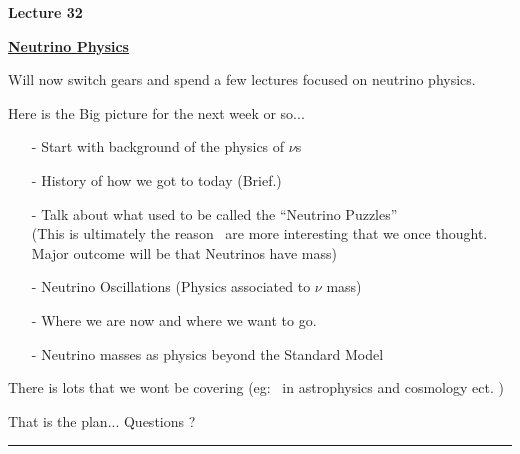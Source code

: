 
\usepackage{braket}
\usepackage{bbm}
\usepackage{relsize}
\usepackage{tcolorbox}




\usepackage{fancyhdr}

\fancyhf{}


\thispagestyle{fancy}

\begin{center}
{\huge \textbf{Lecture 32}}
\end{center}

{\fontsize{14}{16}\selectfont

\textbf{\underline{Neutrino Physics}} 

Will now switch gears and spend a few lectures focused on neutrino physics. 

Here is the Big picture for the next week or so...

\begin{itemize}
\item[-] Start with background of the physics of $\nu$s
\item[-] History of how we got to today (Brief.)
\item[-] Talk about what used to be called the ``Neutrino Puzzles''\\
          (This is ultimately the reason \nus\ are more interesting that we once thought.\\ Major outcome will be that Neutrinos have mass)
\item[-] Neutrino Oscillations (Physics associated to $\nu$ mass)
\item[-] Where we are now and where we want to go.
\item[-] Neutrino masses as physics beyond the Standard Model\\
\end{itemize}

There is lots that we wont be covering (eg: \nus\ in astrophysics and cosmology ect. )

\vspace*{0.4in}

That is the plan... Questions ?

\vspace*{0.2in}

\noindent\rule{\textwidth}{1pt}

}
